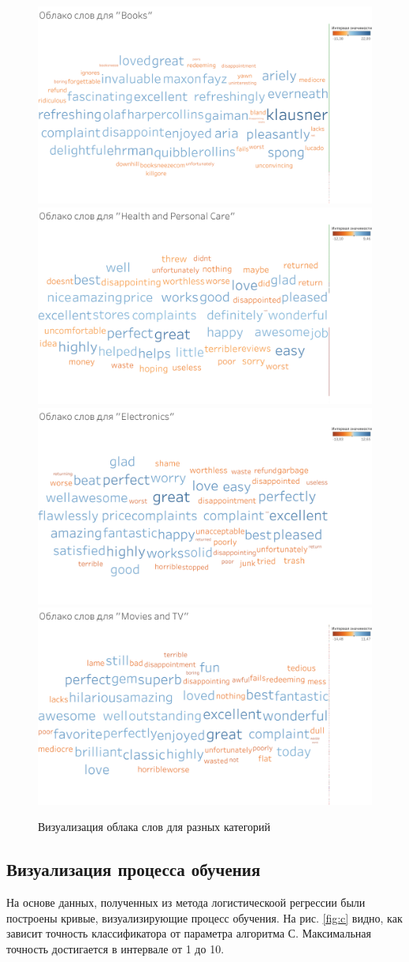 \documentclass[a4paper,12pt]{article}
\begin{document}
\begin{figure}[t]
	\centering
	\includegraphics[width=0.45\linewidth]{1}
	\includegraphics[width=0.45\linewidth]{2}
	\includegraphics[width=0.45\linewidth]{3}
	\includegraphics[width=0.45\linewidth]{4}
	\caption{Визуализация облака слов для разных категорий}
	\label{fig:tcloud1}
\end{figure}

\subsection{Визуализация процесса обучения}
На основе данных, полученных из метода логистическоой регрессии были построены кривые, визуализирующие процесс обучения. На рис. \ref{fig:c} видно, как зависит точность классификатора от параметра алгоритма С. Максимальная точность достигается в интервале от 1 до 10. 
\end{document}
